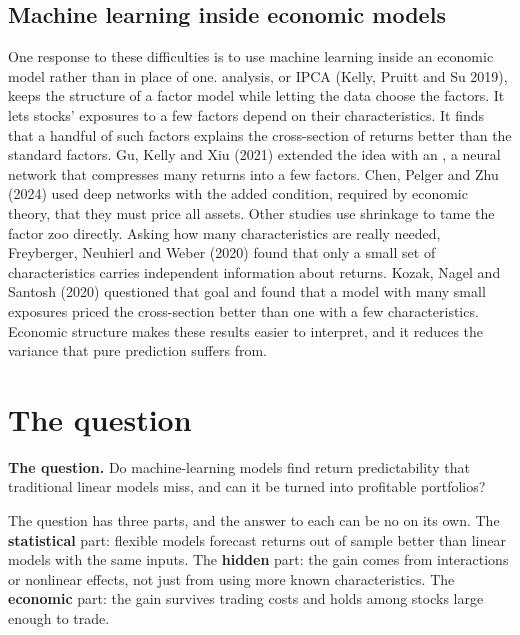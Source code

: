 \subsection{Machine learning inside economic models}

One response to these difficulties is to use machine learning inside an economic model rather than in place of one.  analysis, or IPCA (Kelly, Pruitt and Su 2019), keeps the structure of a factor model while letting the data choose the factors. It lets stocks' exposures to a few factors depend on their characteristics. It finds that a handful of such factors explains the cross-section of returns better than the standard factors. Gu, Kelly and Xiu (2021) extended the idea with an , a neural network that compresses many returns into a few factors. Chen, Pelger and Zhu (2024) used deep networks with the added condition, required by economic theory, that they must price all assets. Other studies use shrinkage to tame the factor zoo directly. Asking how many characteristics are really needed, Freyberger, Neuhierl and Weber (2020) found that only a small set of characteristics carries independent information about returns. Kozak, Nagel and Santosh (2020) questioned that goal and found that a model with many small exposures priced the cross-section better than one with a few characteristics. Economic structure makes these results easier to interpret, and it reduces the variance that pure prediction suffers from.

\section{The question}
\label{sec:20-claim}

\begin{callout}
\textbf{The question.} Do machine-learning models find return predictability that traditional linear models miss, and can it be turned into profitable portfolios?
\end{callout}

The question has three parts, and the answer to each can be no on its own. The \textbf{statistical} part: flexible models forecast returns out of sample better than linear models with the same inputs. The \textbf{hidden} part: the gain comes from interactions or nonlinear effects, not just from using more known characteristics. The \textbf{economic} part: the gain survives trading costs and holds among stocks large enough to trade.

